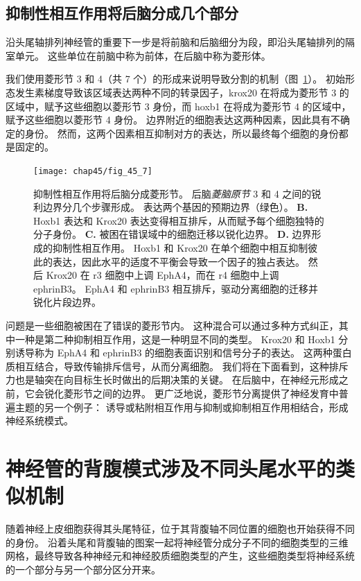 \subsection{抑制性相互作用将后脑分成几个部分}

沿头尾轴排列神经管的重要下一步是将前脑和后脑细分为段，即沿头尾轴排列的隔室单元。
这些单位在前脑中称为前体，在后脑中称为菱形体。


我们使用菱形节 3 和 4（共 7 个）的形成来说明导致分割的机制（图~\ref{fig:45_7}）。
初始形态发生素梯度导致该区域表达两种不同的转录因子，krox20 在将成为菱形节 3 的区域中，赋予这些细胞以菱形节 3 身份，而 hoxb1 在将成为菱形节 4 的区域中，赋予这些细胞以菱形节 4 身份。
边界附近的细胞表达这两种因素，因此具有不确定的身份。
然而，这两个因素相互抑制对方的表达，所以最终每个细胞的身份都是固定的。


\begin{figure}[htbp]
	\centering
	\texttt{[image: chap45/fig\_45\_7]}
	\caption{抑制性相互作用将后脑分成菱形节。
		后脑\textit{菱脑原节} 3 和 4 之间的锐利边界分几个步骤形成\cite{addison2016segment}。
		表达两个基因的预期边界（绿色）。
		\textbf{B.} Hoxb1 表达和 Krox20 表达变得相互排斥，从而赋予每个细胞独特的分子身份。
		\textbf{C.} 被困在错误域中的细胞迁移以锐化边界。
		\textbf{D.} 边界形成的抑制性相互作用。
		Hoxb1 和 Krox20 在单个细胞中相互抑制彼此的表达，因此水平的适度不平衡会导致一个因子的独占表达。
		然后 Krox20 在 r3 细胞中上调 EphA4，而在 r4 细胞中上调 ephrinB3。
		EphA4 和 ephrinB3 相互排斥，驱动分离细胞的迁移并锐化片段边界。}
	\label{fig:45_7}
\end{figure}


问题是一些细胞被困在了错误的菱形节内。
这种混合可以通过多种方式纠正，其中一种是第二种抑制相互作用，这是一种明显不同的类型。
Krox20 和 Hoxb1 分别诱导称为 EphA4 和 ephrinB3 的细胞表面识别和信号分子的表达。
这两种蛋白质相互结合，导致传输排斥信号，从而分离细胞。
我们将在下面看到，这种排斥力也是轴突在向目标生长时做出的后期决策的关键。
在后脑中，在神经元形成之前，它会锐化菱形节之间的边界。
更广泛地说，菱形节分离提供了神经发育中普遍主题的另一个例子：
诱导或粘附相互作用与抑制或抑制相互作用相结合，形成神经系统模式。




\section{神经管的背腹模式涉及不同头尾水平的类似机制}

随着神经上皮细胞获得其头尾特征，位于其背腹轴不同位置的细胞也开始获得不同的身份。
沿着头尾和背腹轴的图案一起将神经管分成分子不同的细胞类型的三维网格，最终导致各种神经元和神经胶质细胞类型的产生，这些细胞类型将神经系统的一个部分与另一个部分区分开来。



